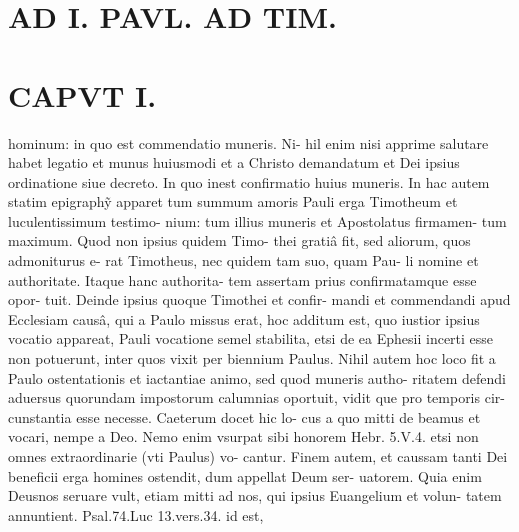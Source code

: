 \documentclass{article}
\begin{document}
\begin{pages}
\section*{AD I. PAVL. AD TIM. }
\section*{CAPVT I. }
\marginpar{[ p.3 ]}hominum: in quo est commendatio muneris. Ni- hil enim nisi apprime salutare habet legatio et munus huiusmodi et a Christo demandatum et Dei ipsius ordinatione siue decreto. In quo inest confirmatio huius muneris. In hac autem statim epigraphỹ apparet tum summum amoris Pauli erga Timotheum et luculentissimum testimo- nium: tum illius muneris et Apostolatus firmamen- tum maximum. Quod non ipsius quidem Timo- thei gratiâ fit, sed aliorum, quos admoniturus e- rat Timotheus, nec quidem tam suo, quam Pau- li nomine et authoritate. Itaque hanc authorita- tem assertam prius confirmatamque esse opor- tuit. Deinde ipsius quoque Timothei et confir- mandi et commendandi apud Ecclesiam causâ, qui a Paulo missus erat, hoc additum est, quo iustior ipsius vocatio appareat, Pauli vocatione semel stabilita, etsi de ea Ephesii incerti esse non potuerunt, inter quos vixit per biennium Paulus. Nihil autem hoc loco fit a Paulo ostentationis et iactantiae animo, sed quod muneris autho- ritatem defendi aduersus quorundam impostorum calumnias oportuit, vidit que pro temporis cir- cunstantia esse necesse. Caeterum docet hic lo- cus a quo mitti de beamus et vocari, nempe a Deo. Nemo enim vsurpat sibi honorem Hebr. 5.V.4. etsi non omnes extraordinarie (vti Paulus) vo- cantur. Finem autem, et caussam tanti Dei beneficii erga homines ostendit, dum appellat Deum ser- uatorem. Quia enim Deusnos seruare vult, etiam mitti ad nos, qui ipsius Euangelium et volun- tatem annuntient. Psal.74.Luc 13.vers.34. id est, 
\marginpar{[ p.4 ]}

\end{pages}
\end{document}
